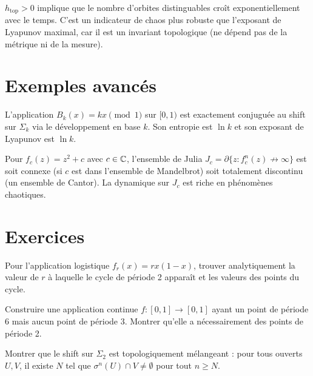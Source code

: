 \begin{attention}[title=\textbf{Entropie et complexit\'e}]
$h_{\mathrm{top}} > 0$ implique que le nombre d'orbites distinguables cro\^it
exponentiellement avec le temps. C'est un indicateur de chaos plus robuste que
l'exposant de Lyapunov maximal, car il est un invariant topologique (ne d\'epend
pas de la m\'etrique ni de la mesure).
\end{attention}

\section{Exemples avanc\'es}

\begin{exemple}
L'application $B_k(x) = kx \pmod{1}$ sur $[0, 1)$ est exactement conjugu\'ee
au shift sur $\Sigma_k$ via le d\'eveloppement en base $k$. Son entropie est
$\ln k$ et son exposant de Lyapunov est $\ln k$.
\end{exemple}

\begin{exemple}
Pour $f_c(z) = z^2 + c$ avec $c \in \mathbb{C}$, l'ensemble de Julia
$J_c = \partial\{z : f_c^n(z) \not\to \infty\}$ est soit connexe (si $c$ est
dans l'ensemble de Mandelbrot) soit totalement discontinu (un ensemble de
Cantor). La dynamique sur $J_c$ est riche en ph\'enom\`enes chaotiques.
\end{exemple}

\section{Exercices}

\begin{exercice}
Pour l'application logistique $f_r(x) = rx(1-x)$, trouver analytiquement la
valeur de $r$ \`a laquelle le cycle de p\'eriode 2 appara\^it et les valeurs
des points du cycle.
\end{exercice}

\begin{exercice}[Sharkovskii]
Construire une application continue $f : [0,1] \to [0,1]$ ayant un point de
p\'eriode 6 mais aucun point de p\'eriode 3. Montrer qu'elle a n\'ecessairement
des points de p\'eriode 2.
\end{exercice}

\begin{exercice}
Montrer que le shift sur $\Sigma_2$ est topologiquement m\'elangeant : pour
tous ouverts $U, V$, il existe $N$ tel que $\sigma^n(U) \cap V \neq \emptyset$
pour tout $n \geq N$.
\end{exercice}

